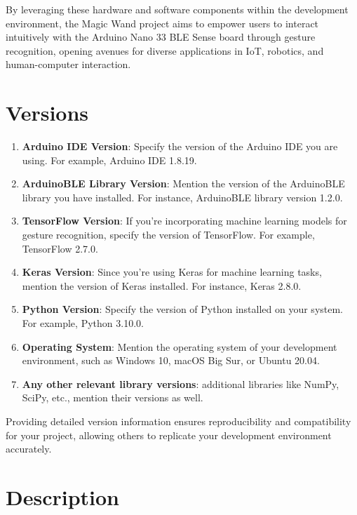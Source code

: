By leveraging these hardware and software components within the development environment, the Magic Wand project aims to empower users to interact intuitively with the Arduino Nano 33 BLE Sense board through gesture recognition, opening avenues for diverse applications in IoT, robotics, and human-computer interaction.\cite{Kurniawan:2021}


\section{Versions}

\begin{enumerate}
    \item \textbf{Arduino IDE Version}: Specify the version of the Arduino IDE you are using. For example, Arduino IDE 1.8.19.
    
    \item \textbf{ArduinoBLE Library Version}: Mention the version of the ArduinoBLE library you have installed. For instance, ArduinoBLE library version 1.2.0.
    
    \item \textbf{TensorFlow Version}: If you're incorporating machine learning models for gesture recognition, specify the version of TensorFlow. For example, TensorFlow 2.7.0.\cite{ArduinoSoftware:2024}
    
    \item \textbf{Keras Version}: Since you're using Keras for machine learning tasks, mention the version of Keras installed. For instance, Keras 2.8.0.
    
    \item \textbf{Python Version}: Specify the version of Python installed on your system. For example, Python 3.10.0.\cite{PythonDownload:2024}
    
    \item \textbf{Operating System}: Mention the operating system of your development environment, such as Windows 10, macOS Big Sur, or Ubuntu 20.04.
    
    \item \textbf{Any other relevant library versions}: additional libraries like NumPy, SciPy, etc., mention their versions as well.
\end{enumerate}

Providing detailed version information ensures reproducibility and compatibility for your project, allowing others to replicate your development environment accurately.


\section{Description}

